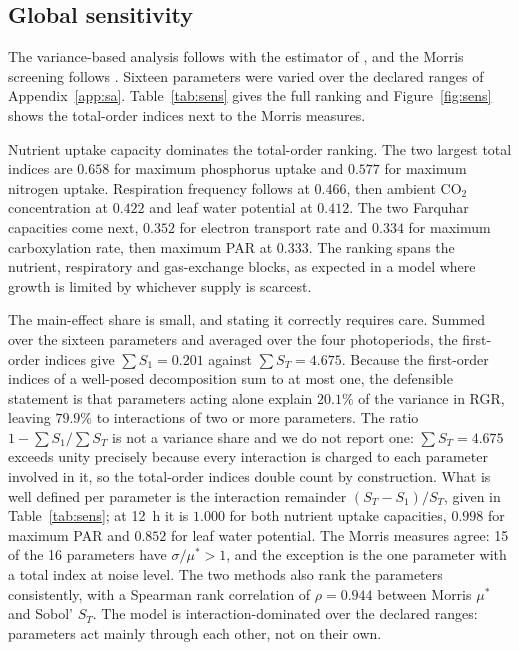 \subsection{Global sensitivity}
\label{sec:results:sens}

The variance-based analysis follows \citet{Sobol2001} with the estimator of
\citet{Saltelli2010}, and the Morris screening follows
\citet{Morris1991,Campolongo2007}. Sixteen parameters were varied over the
declared ranges of Appendix~\ref{app:sa}. Table~\ref{tab:sens} gives the full
ranking and Figure~\ref{fig:sens} shows the total-order indices next to the
Morris measures.

Nutrient uptake capacity dominates the total-order ranking. The two largest
total indices are $0.658$ for maximum phosphorus uptake and $0.577$ for maximum
nitrogen uptake. Respiration frequency follows at $0.466$, then ambient CO$_2$
concentration at $0.422$ and leaf water potential at $0.412$. The two Farquhar
capacities come next, $0.352$ for electron transport rate and $0.334$ for
maximum carboxylation rate, then maximum PAR at $0.333$. The ranking spans the
nutrient, respiratory and gas-exchange blocks, as expected in a model where
growth is limited by whichever supply is scarcest.

The main-effect share is small, and stating it correctly requires care. Summed
over the sixteen parameters and averaged over the four photoperiods, the
first-order indices give $\sum S_1 = 0.201$ against $\sum S_T = 4.675$. Because
the first-order indices of a well-posed decomposition sum to at most one, the
defensible statement is that parameters acting alone explain $20.1\%$ of the
variance in RGR, leaving $79.9\%$ to interactions of two or more parameters. The
ratio $1 - \sum S_1 / \sum S_T$ is not a variance share and we do not report one:
$\sum S_T = 4.675$ exceeds unity precisely because every interaction is charged
to each parameter involved in it, so the total-order indices double count by
construction. What is well defined per parameter is the interaction remainder
$(S_T - S_1)/S_T$, given in Table~\ref{tab:sens}; at 12~h it is $1.000$ for both
nutrient uptake capacities, $0.998$ for maximum PAR and $0.852$ for leaf water
potential. The
Morris measures agree: 15 of the 16 parameters have $\sigma/\mu^{*} > 1$, and
the exception is the one parameter with a total index at noise level. The two
methods also rank the parameters consistently, with a Spearman rank correlation
of $\rho = 0.944$ between Morris $\mu^{*}$ and Sobol' $S_T$. The model is
interaction-dominated over the declared ranges: parameters act mainly through
each other, not on their own.

